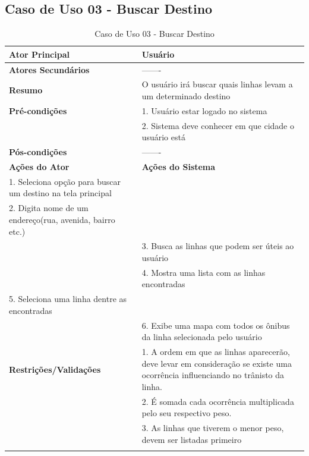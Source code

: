 \subsection{Caso de Uso 03 - Buscar Destino}
\begin{center}
\begin{longtable}{p{8cm}|p{8cm}}
    \hline
    \textbf{Ator Principal} & Usu\'{a}rio \\
    \hline
    \textbf{Atores Secund\'{a}rios} & ------- \\
    \hline
    \textbf{Resumo} &  O usu\'{a}rio ir\'{a} buscar quais linhas levam a um determinado destino\\
    \hline
    \textbf{Pr\'{e}-condi\c{c}\~{o}es} & 1. Usu\'{a}rio estar logado no sistema\\ \cline{2-2} & 2. Sistema deve conhecer em que cidade o usu\'{a}rio est\'{a} \\ \cline{2-2}
    \hline
    \textbf{P\'{o}s-condi\c{c}\~{o}es} & ------- \\
    \hline
    \textbf{A\c{c}\~{o}es do Ator} & \textbf{A\c{c}\~{o}es do Sistema} \\
    \hline
    1. Seleciona  op\c{c}\~{a}o para buscar um destino na tela principal & \\
    \hline
    2. Digita nome de um endere\c{c}o(rua, avenida, bairro etc.) & \\
    \hline
    & 3. Busca as linhas que podem ser \'{u}teis ao usu\'{a}rio\\
    \hline
    & 4. Mostra uma lista com as linhas encontradas\\
    \hline
    5. Seleciona uma linha dentre as encontradas & \\
    \hline
    & 6. Exibe uma mapa com todos os \^{o}nibus da linha selecionada pelo usu\'{a}rio \\
    \hline
    \hline
    \textbf{Restri\c{c}\~{o}es/Valida\c{c}\~{o}es} & 1. A ordem em que as linhas aparecer\~{a}o, deve levar em considera\c{c}\~{a}o se existe uma ocorr\^{e}ncia influenciando no tr\^{a}nisto da linha. \\ \cline{2-2}& 2. \'{E} somada cada ocorr\^{e}ncia multiplicada pelo seu respectivo peso. \\ \cline{2-2} & 3. As linhas que tiverem o menor peso, devem ser listadas primeiro\\
\hline
\caption{Caso de Uso 03 - Buscar Destino}
\end{longtable}
\end{center}

